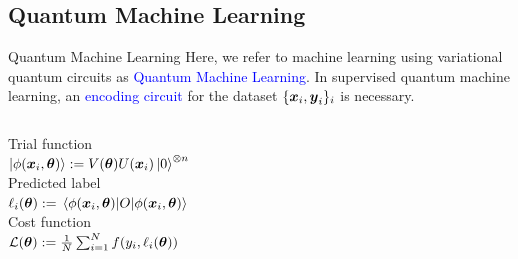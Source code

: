 \documentclass[dvipdfmx,10pt,aspectratio=169]{beamer}
\begin{document}
\subsection{Quantum Machine Learning}

\newcommand{\encdash}{\gategroup[3,steps=1,style={inner sep=-5pt},background,label style={label position=below,anchor=north,yshift=-0.3cm}]{Encoding}}
\newcommand{\ansdash}{\gategroup[3,steps=1,style={inner sep=-5pt},background,label style={label position=below,anchor=north,yshift=-0.3cm}]{Ansatz}}

\begin{frame}{Quantum Machine Learning}
    Here, we refer to machine learning using variational quantum circuits as \textcolor{blue}{Quantum Machine Learning}. In supervised quantum machine learning, an \textcolor{blue}{encoding circuit} for the dataset $\{\vb*{x}_i,\vb*{y}_i\}_i$ is necessary.

    \begin{center}
        {\large\colorbox{blue!40}{}}
    \end{center}
    \begin{columns}
        \begin{column}{0.5\textwidth}
            \centering
            Trial function\\
            $\ket{\phi(\vb*{x}_i,\vb*{\theta})} := V(\vb*{\theta})U(\vb*{x}_i)\ket{0}^{\otimes n}$\\
            \vspace*{10pt}
            Predicted label\\
            $\ell_{i}(\vb*{\theta}) := \expval{O}{\phi(\vb*{x}_i,\vb*{\theta})}$\\
            \vspace*{10pt}
            Cost function\\
            $\mathcal{L}(\vb*{\theta}) := \frac1N\sum_{i=1}^N f(y_i,\ell_{i}(\vb*{\theta}))$
        \end{column}


\end{columns}
\end{frame}
\end{document}
